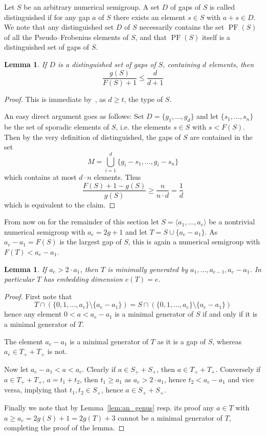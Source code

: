 \documentclass[a4paper,12pt,scrbook]{amsart}
\theoremstyle{plain}%
\newtheorem{lemma}[satz]{Lemma}
\theoremstyle{definition}
\begin{document}
Let $S$ be an arbitrary numerical semigroup. A set $D$ of gaps of $S$ is called 
distinguished if for any gap $a$ of $S$ there exists an element $s \in S$ with 
$a + s \in D$. We note that any distinguished set $D$ of $S$ necessarily contains 
the set $\operatorname{PF}(S)$ of all the Pseudo--Frobenius elements of $S$, and 
that $\operatorname{PF}(S)$ itself is a distinguished set of gaps of $S$. 

\begin{lemma}\label{lem:dist} 
If $D$ is a distinguished set of gaps of $S$, containing $d$ elements, then 
	$$ \frac {g(S)}{F(S)+1} \leq \frac {d}{d+1} $$ 
\end{lemma}

\begin{proof}
This is immediate by~\cite[Theorem 20]{FGH}, as $d \geq t$, the type of $S$. 

An easy direct argument goes as follows:  Set $D = \{g_1, \ldots, g_d\}$ and let 
$\{s_1, \ldots, s_n\}$ be the set of sporadic elements of $S$, i.e. the elements 
$s \in S$ with $s < F(S)$. Then by the very 
definition of distinguished, the gaps of $S$ are contained in the set 
	$$ M = \bigcup_{i=1}^d \{g_i-s_1,\ldots, g_i-s_n\} $$
which contains at most $d \cdot n$ elements. Thus 
	$$ \frac {F(S) +1 - g(S)}{g(S)} \geq \frac {n}{n \cdot d} = \frac {1}{d} $$
which is equivalent to the claim. 
\end{proof}

From now on for the remainder of this section let 
$S = \langle a_1, \ldots, a_e \rangle $ be a nontrivial numerical semigroup 
with $a_e = 2g+1$ and let $T = S \cup \{a_e-a_1\} $. As  
$a_e-a_1 = F(S)$ is the largest gap of $S$, this is again a numerical 
semigroup with $F(T) < a_e-a_1$. 

\begin{lemma}\label{lem:lgap_min_gen}
If $a_e > 2 \cdot a_1$, then $T$ is minimally generated by $a_1, \ldots, a_{e-1}, 
a_e-a_1$. In particular $T$ has embedding dimension $e(T) = e$. 
\end{lemma}

\begin{proof}
First note that 
	$$ T \cap \left(\{0, 1, \ldots, a_e\} \setminus \{a_e-a_1\} \right) = 
	S  \cap \left(\{0, 1, \ldots, a_e\} \setminus \{a_e-a_1\} \right) $$
hence any element $0 < a < a_e-a_1$ is a minimal generator of $S$ if and only if it 
is a minimal generator of $T$. 

The element $a_e - a_1$ is a minimal generator of $T$ as it is a gap of $S$, whereas 
$a_e \in T_+ + T_+$ is not. 

Now let $a_e-a_1 < a < a_e$. Clearly if $a \in S_+ + S_+$, then $a \in T_++T_+$. 
Conversely if $a \in T_+ + T_+$, $a = t_1 + t_2$, then $t_1 \geq a_1$ 
as $a_e > 2 \cdot a_1$, hence $t_2 
< a_e-a_1$ and vice versa, implying that $t_1, t_2 \in S_+$, hence $a \in S_+ + S_+$. 

Finally we note that by Lemma~\ref{lem:an_genus} resp. its proof any $a \in T$ 
with $a \geq a_e = 2g(S) + 1 = 2g(T)+3$ cannot be a minimal generator of $T$, 
completing the proof of the lemma. 
\end{proof}
\end{document}
